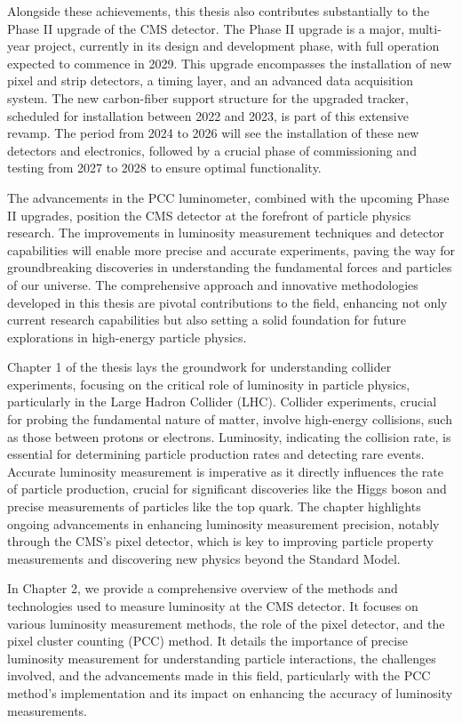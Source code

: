 Alongside these achievements, this thesis also contributes substantially to the Phase II upgrade of the CMS detector. The Phase II upgrade is a major, multi-year project, currently in its design and development phase, with full operation expected to commence in 2029. This upgrade encompasses the installation of new pixel and strip detectors, a timing layer, and an advanced data acquisition system. The new carbon-fiber support structure for the upgraded tracker, scheduled for installation between 2022 and 2023, is part of this extensive revamp. The period from 2024 to 2026 will see the installation of these new detectors and electronics, followed by a crucial phase of commissioning and testing from 2027 to 2028 to ensure optimal functionality.

The advancements in the PCC luminometer, combined with the upcoming Phase II upgrades, position the CMS detector at the forefront of particle physics research. The improvements in luminosity measurement techniques and detector capabilities will enable more precise and accurate experiments, paving the way for groundbreaking discoveries in understanding the fundamental forces and particles of our universe. The comprehensive approach and innovative methodologies developed in this thesis are pivotal contributions to the field, enhancing not only current research capabilities but also setting a solid foundation for future explorations in high-energy particle physics.

Chapter 1 of the thesis lays the groundwork for understanding collider experiments, focusing on the critical role of luminosity in particle physics, particularly in the Large Hadron Collider (LHC). Collider experiments, crucial for probing the fundamental nature of matter, involve high-energy collisions, such as those between protons or electrons. Luminosity, indicating the collision rate, is essential for determining particle production rates and detecting rare events. Accurate luminosity measurement is imperative as it directly influences the rate of particle production, crucial for significant discoveries like the Higgs boson and precise measurements of particles like the top quark. The chapter highlights ongoing advancements in enhancing luminosity measurement precision, notably through the CMS's pixel detector, which is key to improving particle property measurements and discovering new physics beyond the Standard Model.

In Chapter 2, we provide a comprehensive overview of the methods and technologies used to measure luminosity at the CMS detector. It focuses on various luminosity measurement methods, the role of the pixel detector, and the pixel cluster counting (PCC) method. It details the importance of precise luminosity measurement for understanding particle interactions, the challenges involved, and the advancements made in this field, particularly with the PCC method's implementation and its impact on enhancing the accuracy of luminosity measurements.

